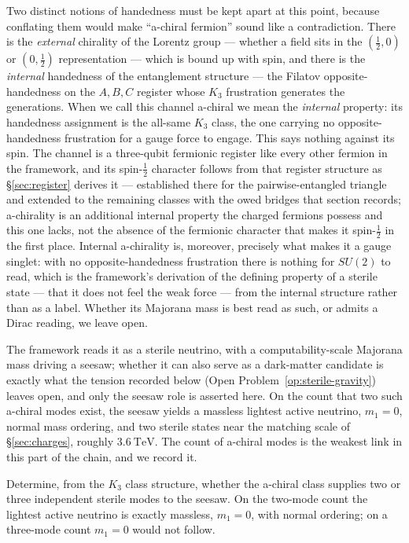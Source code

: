 Two distinct notions of handedness must be kept apart at this point, because conflating them would
make ``a-chiral fermion'' sound like a contradiction. There is the \emph{external} chirality of the
Lorentz group --- whether a field sits in the $(\tfrac12,0)$ or $(0,\tfrac12)$ representation --- which
is bound up with spin, and there is the \emph{internal} handedness of the entanglement structure ---
the Filatov opposite-handedness on the $A,B,C$ register whose $K_3$ frustration generates the
generations. When we call this channel a-chiral we mean the \emph{internal} property: its handedness
assignment is the all-same $K_3$ class, the one carrying no opposite-handedness frustration for a
gauge force to engage. This says nothing against its spin. The channel is a three-qubit fermionic
register like every other fermion in the framework, and its spin-$\tfrac12$ character follows from
that register structure as \S\ref{sec:register} derives it --- established there for the
pairwise-entangled triangle and extended to the remaining classes with the owed bridges that
section records; a-chirality is an additional internal property the
charged fermions possess and this one lacks, not the absence of the fermionic character that makes it
spin-$\tfrac12$ in the first place. Internal a-chirality is, moreover, precisely what makes it a
gauge singlet: with no opposite-handedness frustration there is nothing for $SU(2)$ to read, which is
the framework's derivation of the defining property of a sterile state --- that it does not feel the
weak force --- from the internal structure rather than as a label. Whether its Majorana mass is best
read as such, or admits a Dirac reading, we leave open.

The framework reads it as a sterile neutrino, with a computability-scale Majorana mass driving a
seesaw; whether it can also serve as a dark-matter candidate is exactly what the tension recorded
below (Open Problem~\ref{op:sterile-gravity}) leaves open, and only the seesaw role is asserted
here. On the count that two such a-chiral modes exist, the seesaw yields a massless lightest active
neutrino, $m_1 = 0$, normal mass ordering, and two sterile states near the matching scale of
\S\ref{sec:charges}, roughly $3.6\ \mathrm{TeV}$. The count of a-chiral modes is the weakest link in this part of the
chain, and we record it.

\begin{openproblem}\label{op:sterile-count}
Determine, from the $K_3$ class structure, whether the a-chiral class supplies two or three
independent sterile modes to the seesaw. On the two-mode count the lightest active neutrino is
exactly massless, $m_1 = 0$, with normal ordering; on a three-mode count $m_1 = 0$ would not follow.
\end{openproblem}

